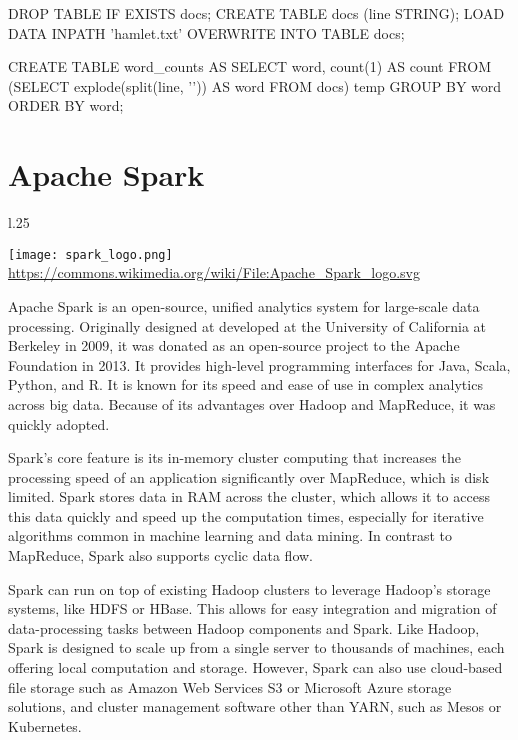 \begin{sqlcode}
DROP TABLE IF EXISTS docs;
CREATE TABLE docs (line STRING);
LOAD DATA INPATH 'hamlet.txt' 
  OVERWRITE INTO TABLE docs;
  
CREATE TABLE word_counts AS
SELECT word, count(1) AS count FROM
  (SELECT explode(split(line, '\s')) 
    AS word FROM docs) temp
GROUP BY word
ORDER BY word;
\end{sqlcode}

\section{Apache Spark}

\begin{wrapfigure}{l}{.25\textwidth}
\begin{center}
\texttt{[image: spark\_logo.png]}
\tiny \url{https://commons.wikimedia.org/wiki/File:Apache_Spark_logo.svg} \normalsize
\end{center}
\end{wrapfigure}
Apache Spark is an open-source, unified analytics system for large-scale data processing. Originally designed at developed at the University of California at Berkeley in 2009, it was donated as an open-source project to the Apache Foundation in 2013. It provides high-level programming interfaces for Java, Scala, Python, and R. It is known for its speed and ease of use in complex analytics across big data. Because of its advantages over Hadoop and MapReduce, it was quickly adopted.

Spark's core feature is its in-memory cluster computing that increases the processing speed of an application significantly over MapReduce, which is disk limited. Spark stores data in RAM across the cluster, which allows it to access this data quickly and speed up the computation times, especially for iterative algorithms common in machine learning and data mining. In contrast to MapReduce, Spark also supports cyclic data flow.

Spark can run on top of existing Hadoop clusters to leverage Hadoop's storage systems, like HDFS or HBase. This allows for easy integration and migration of data-processing tasks between Hadoop components and Spark. Like Hadoop, Spark is designed to scale up from a single server to thousands of machines, each offering local computation and storage. However, Spark can also use cloud-based file storage such as Amazon Web Services S3 or Microsoft Azure storage solutions, and cluster management software other than YARN, such as Mesos or Kubernetes.

